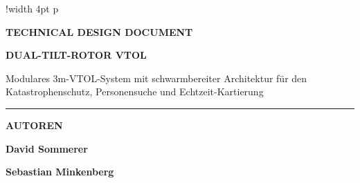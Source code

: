 \documentclass[12pt,a4paper,oneside]{report}
\begin{document}
\color{Charcoal} 

\begin{titlepage}
    \flushleft 
    
    \begin{figure}[h!]
        \flushleft
        \hspace{1cm}
    \end{figure}
    
    \vspace*{2.5cm}
    
    \noindent
    \begin{tabular}{!{\color{AerospaceNavy}\vrule width 4pt} p{\dimexpr\textwidth-25pt}}
        \hspace{15pt} \begin{minipage}{\linewidth}
            {\LARGE\bfseries TECHNICAL DESIGN DOCUMENT\par}
            \vspace{0.4cm}
            {\Huge\bfseries DUAL-TILT-ROTOR VTOL\par}
            \vspace{0.6cm}
            {\large\color{Charcoal}Modulares 3m-VTOL-System mit schwarmbereiter Architektur für den Katastrophenschutz, Personensuche und Echtzeit-Kartierung\par}
        \end{minipage}
    \end{tabular}

    \vfill
    \vfill
    
    \noindent\textcolor{LightGrey}{\rule{\textwidth}{1pt}}
    \vspace*{0.6cm}

    \begin{minipage}[t]{0.5\textwidth}
        {\footnotesize\color{AerospaceNavy}\uppercase{\textbf{Autoren}}\par}
        \vspace{0.1cm}
        {\large\textbf{David Sommerer}}\par
        {\large\textbf{Sebastian Minkenberg}}\par
        
        \vspace{0.6cm} %
        

\end{minipage}
\end{titlepage}
\end{document}
